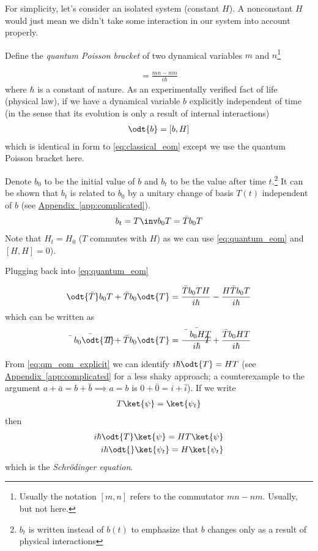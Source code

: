 \documentclass[12pt, oneside, letterpaper, fleqn]{article}
\begin{document}
For simplicity, let's consider an isolated system (constant $H$). A
nonconstant $H$ would just mean we didn't take some interaction in our
system into account properly.

Define the \emph{quantum Poisson bracket} of two dynamical variables $m$
and $n$\footnote{Usually the notation $[m,n]$ refers to the commutator
$mn-nm$. Usually, but not here.}

\begin{align}
[m, n] = \frac{mn - nm}{i\hbar}
\end{align}
where $\hbar$ is a constant of nature. As an experimentally verified
fact of life (physical law), if we have a dynamical variable $b$
explicitly independent of time (in the sense that its evolution is only
a result of internal interactions)
\begin{align}\label{eq:quantum_eom}
\odt{b} = [b, H]
\end{align}
which is identical in form to \eqref{eq:classical_eom} except we use
the quantum Poisson bracket here.

Denote $b_0$ to be the initial value of $b$ and $b_t$ to be the value
after time $t$.\footnote{$b_t$ is written instead of $b(t)$ to emphasize
that $b$ changes only as a result of physical interactions} It can be
shown that $b_t$ is related to $b_0$ by a unitary change of basis $T(t)$
independent of $b$ (see
\hyperref[app:complicated]{Appendix~\ref*{app:complicated}}).
\begin{align}
b_t = T\inv b_0 T = \bar{T} b_0 T
\end{align}
Note that $H_t = H_0$ ($T$ commutes with $H$) as we can use
\eqref{eq:quantum_eom} and $[H, H] = 0$).

Plugging back into \eqref{eq:quantum_eom}

\begin{align*}
\odt{\bar{T}} b_0 T + \bar{T} b_0 \odt{T}
= \frac{\bar{T}b_0TH}{i\hbar} - \frac{H\bar{T}b_0T}{i\hbar}\\
\end{align*}
which can be written as
\begin{align}\label{eq:qm_eom_explicit}
\bar{\bar{T} b_0 \odt{T}}+ \bar{T} b_0 \odt{T}
= \bar{\frac{\bar{T}b_0HT}{i\hbar}} +
\frac{\bar{T}b_0HT}{i\hbar} 
\end{align}

From \eqref{eq:qm_eom_explicit} we can identify $i\hbar \odt{T} =
HT$ (see \hyperref[app:complicated]{Appendix~\ref*{app:complicated}}
for a less shaky approach; a counterexample to the argument $a + \bar{a}
= b + \bar{b} \implies a = b$ is $0 + \bar{0} = i + \bar{i}$). If we write
\begin{align}\label{eq:schrodinger_psi}
T\ket{\psi} = \ket{\psi_t}
\end{align}
then
\begin{align}\label{eq:schrodinger_equation}
i\hbar \odt{T} \ket{\psi} = HT\ket{\psi}\nonumber\\
i\hbar \odt{}\ket{\psi_t} = H\ket{\psi_t}
\end{align}
which is the \emph{Schr\"odinger equation}.
\end{document}
